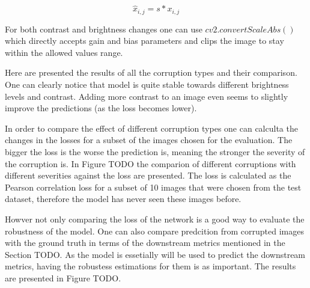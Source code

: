 \begin{equation}
    \hat{x}_{i, j} = s * x_{i, j}
\end{equation}

For both contrast and brightness changes one can use $cv2.convertScaleAbs()$ which directly accepts gain and bias parameters and clips the image to stay within the allowed values range.

Here are presented the results of all the corruption types and their comparison. One can clearly notice that model is quite stable towards different brightness levels and contrast. Adding more contrast to an image even seems to slightly improve the predictions (as the loss becomes lower). 

In order to compare the effect of different corruption types one can calculta the changes in the losses for a subset of the images chosen for the evaluation. The bigger the loss is the worse the prediction is, meaning the stronger the severity of the corruption is. In Figure TODO the comparion of different corruptions with different severities against the loss are presented. The loss is calculated as the Pearson correlation loss for a subset of 10 images that were chosen from the test dataset, therefore the model has never seen these images before.

Howver not only comparing the loss of the network is a good way to evaluate the robustness of the model. One can also compare predcition from corrupted images with the ground truth in terms of the downstream metrics mentioned in the Section TODO. As the model is essetially will be used to predict the downstream metrics, having the robustess estimations for them is as important. The results are presented in Figure TODO.